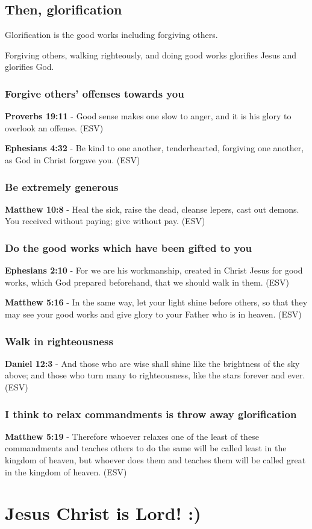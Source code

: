 \documentclass[11pt]{article}
\begin{document}
\subsection{Then, glorification}
\label{sec:orga988dc7}
Glorification is the good works including forgiving others.

Forgiving others, walking righteously, and doing good works glorifies Jesus and glorifies God.

\subsubsection{Forgive others' offenses towards you}
\label{sec:org4c0dbe0}
\textbf{Proverbs 19:11} - Good sense makes one slow to anger, and it is his glory to overlook an offense. (ESV)

\textbf{Ephesians 4:32} - Be kind to one another, tenderhearted, forgiving one another, as God in Christ forgave you. (ESV)

\subsubsection{Be extremely generous}
\label{sec:org46a98b2}
\textbf{Matthew 10:8} - Heal the sick, raise the dead, cleanse lepers, cast out demons. You received without paying; give without pay. (ESV)

\subsubsection{Do the good works which have been gifted to you}
\label{sec:orgcbf572c}
\textbf{Ephesians 2:10} - For we are his workmanship, created in Christ Jesus for good works, which God prepared beforehand, that we should walk in them.  (ESV)

\textbf{Matthew 5:16} - In the same way, let your light shine before others, so that they may see your good works and give glory to your Father who is in heaven.  (ESV)

\subsubsection{Walk in righteousness}
\label{sec:org0fe3cfc}

\textbf{Daniel 12:3} -  And those who are wise shall shine like the brightness of the sky above; and those who turn many to righteousness, like the stars forever and ever.  (ESV)

\subsubsection{I think to relax commandments is throw away glorification}
\label{sec:orge3df3be}
\textbf{Matthew 5:19} -  Therefore whoever relaxes one of the least of these commandments and teaches others to do the same will be called least in the kingdom of heaven, but whoever does them and teaches them will be called great in the kingdom of heaven.  (ESV)

\section{Jesus Christ is Lord! :)}
\label{sec:org6fdc136}
\end{document}
